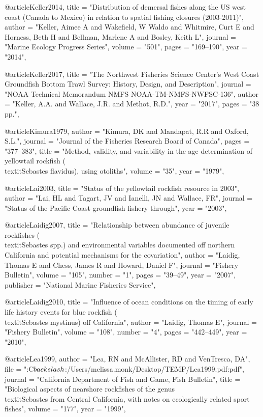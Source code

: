 @article{Keller2014,
    title = "{Distribution of demersal fishes along the US west coast (Canada to Mexico) in relation to spatial fishing closures (2003-2011)}",
    author = "{Keller, Aimee A and Wakefield, W Waldo and Whitmire, Curt E and Horness, Beth H and Bellman, Marlene A and Bosley, Keith L}",
    journal = "{Marine Ecology Progress Series}",
    volume = "{501}",
    pages = "{169--190}",
    year = "{2014}",
}

@article{Keller2017,
    title = "{The Northwest Fisheries Science Center's West Coast Groundfish Bottom Trawl Survey: History, Design, and Description}",
    journal = "{NOAA Technical Memorandum NMFS NOAA-TM-NMFS-NWFSC-136}",
    author = "{Keller, A.A. and Wallace, J.R. and Methot, R.D.}",
    year = "{2017}",
    pages = "{38 pp.}",
}

@article{Kimura1979,
    author = "{Kimura, DK and Mandapat, R.R and Oxford, S.L.}",
    journal = "{Journal of the Fisheries Research Board of Canada}",
    pages = "{377--383}",
    title = "{{Method, validity, and variability in the age determination of yellowtail rockfish (\\textit{{Sebastes} flavidus}), using otoliths}}",
    volume = "{35}",
    year = "{1979}",
}

@article{Lai2003,
    title = "{Status of the yellowtail rockfish resource in 2003}",
    author = "{Lai, HL and Tagart, JV and Ianelli, JN and Wallace, FR}",
    journal = "{Status of the Pacific Coast groundfish fishery through}",
    year = "{2003}",
}

@article{Laidig2007,
    title = "{Relationship between abundance of juvenile rockfishes (\\textit{{{Sebastes}}} spp.) and environmental variables documented off northern California and potential mechanisms for the covariation}",
    author = "{Laidig, Thomas E and Chess, James R and Howard, Daniel F}",
    journal = "{Fishery Bulletin}",
    volume = "{105}",
    number = "{1}",
    pages = "{39--49}",
    year = "{2007}",
    publisher = "{National Marine Fisheries Service}",
}

@article{Laidig2010,
    title = "{Influence of ocean conditions on the timing of early life history events for blue rockfish (\\textit{{{Sebastes}} mystinus}) off California}",
    author = "{Laidig, Thomas E}",
    journal = "{Fishery Bulletin}",
    volume = "{108}",
    number = "{4}",
    pages = "{442--449}",
    year = "{2010}",
}

@article{Lea1999,
    author = "{Lea, RN and McAllister, RD and VenTresca, DA}",
    file = "{:C$\\backslash$:/Users/melissa.monk/Desktop/TEMP/Lea1999.pdf:pdf}",
    journal = "{California Department of Fish and Game, Fish Bulletin}",
    title = "{{Biological aspects of nearshore rockfishes of the genus \\textit{{Sebastes}} from {Central} {California}, with notes on ecologically related sport fishes}}",
    volume = "{177}",
    year = "{1999}",
}

